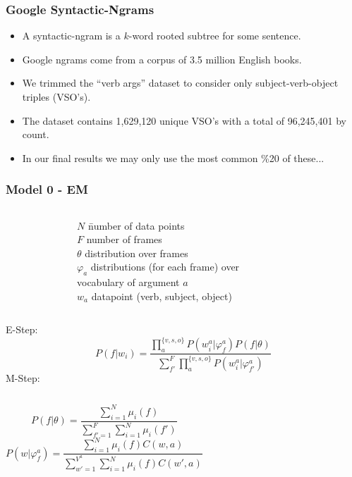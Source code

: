 \documentclass{beamer}
\renewcommand\phi\varphi
\begin{document}
\begin{frame}
  \frametitle{Google Syntactic-Ngrams}
  \begin{itemize}
  \item A syntactic-ngram is a $k$-word rooted subtree for some sentence. 
  \item Google ngrams come from a corpus of 3.5 million English books.
  \item We trimmed the ``verb args'' dataset to consider only subject-verb-object triples (VSO's).
  \item The dataset contains 1,629,120 unique VSO's with a total of 96,245,401 by count.
  \item In our final results we may only use the most common \%20 of these...
  \end{itemize}

\end{frame}

\begin{frame}
  \frametitle{Model 0 - EM }
  \begin{columns}
    \begin{figure}
    
    \end{figure}
  \begin{scriptsize}
  \begin{tabbing}
    $N$ \hspace{10pt}\= number of data points\\
    $F$              \> number of frames\\
    $\theta$         \> distribution over frames\\
    $\varphi_a$      \> distributions (for each frame) over \\ 
                     \> vocabulary of argument $a$\\
    $w_a$            \> datapoint (verb, subject, object)\\
  \end{tabbing}
  \end{scriptsize}
  \end{columns}
\footnotesize{E-Step:}
\[
P(f|w_i) = \frac{\prod_a^{\{v,s,o\}}P(w_i^a|\phi_f^a) P(f|\theta)}{\sum_{f'}^F\prod_a^{\{v,s,o\}}P(w_i^a|\phi_{f'}^a)}
\]
\footnotesize{M-Step:}
\begin{columns}
\[
P(f|\theta) = \frac{\sum_{i=1}^N \mu_i(f)}{\sum_{f'=1}^F\sum_{i=1}^N\mu_i(f')}
\]
\[
P(w|\phi_f^a) = \frac{\sum_{i=1}^N \mu_i(f) C(w,a)}{\sum_{w'=1}^{V^a}\sum_{i=1}^N \mu_i(f) C(w',a)}
\]
\end{columns}
\end{frame}
\end{document}
